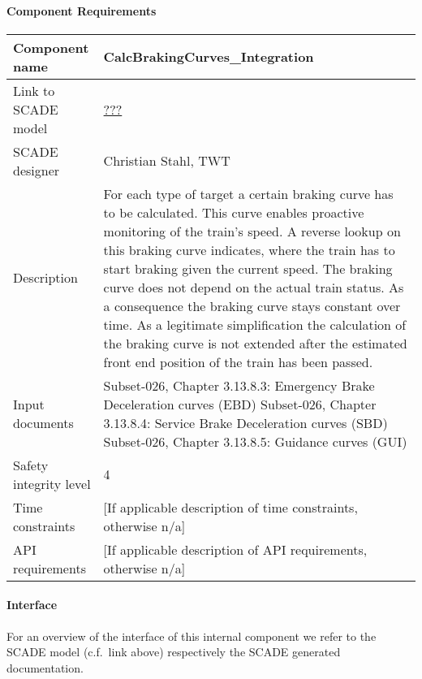 
\paragraph{Component Requirements}

\begin{longtable}{p{}p{}}
\toprule
Component name			& CalcBrakingCurves\_Integration \\
\midrule
Link to SCADE model		& {\footnotesize \url{???}} \\
\midrule
SCADE designer			& Christian Stahl, TWT \\
\midrule
Description				& For each type of target a certain braking curve has to be calculated. This curve enables proactive monitoring of the train's speed. A reverse lookup on this braking curve indicates, where the train has to start braking given the current speed. The braking curve does not depend on the actual train status. As a consequence the braking curve stays constant over time. As a legitimate simplification the calculation of the braking curve is not extended after the estimated front end position of the train has been passed. \\
\midrule
Input documents	& 
Subset-026, Chapter 3.13.8.3: Emergency Brake Deceleration curves (EBD)\newline
Subset-026, Chapter 3.13.8.4: Service Brake Deceleration curves (SBD)\newline
Subset-026, Chapter 3.13.8.5: Guidance curves (GUI) \\
\midrule
Safety integrity level		& 4 \\
\midrule
Time constraints		& [If applicable description of time constraints, otherwise n/a] \\
\midrule
API requirements 		& [If applicable description of API requirements, otherwise n/a] \\
\bottomrule
\end{longtable}


\paragraph{Interface}

For an overview of the interface of this internal component we refer to the SCADE model (c.f.~link above) respectively the SCADE generated documentation.